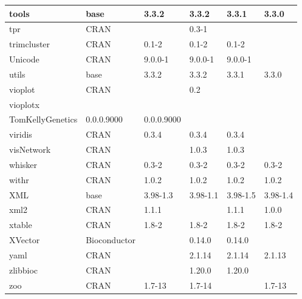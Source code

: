 \begin{longtable}{@{\extracolsep{\fill}}|l|l|l|l|l|l|@{}}
tools                         & base                      & 3.3.2       & 3.3.2       & 3.3.1          & 3.3.0            \\ \hline
tpr                           & CRAN                      &             & 0.3-1       &                &                  \\ \hline
trimcluster                   & CRAN                      & 0.1-2       & 0.1-2       & 0.1-2          &                  \\ \hline
Unicode                       & CRAN                      & 9.0.0-1     & 9.0.0-1     & 9.0.0-1        &                  \\ \hline
utils                         & base                      & 3.3.2       & 3.3.2       & 3.3.1          & 3.3.0            \\ \hline
vioplot                       & CRAN                      &             & 0.2         &                &                  \\ \hline
vioplotx                      & \begin{tabular}[c]{@{}l@{}}GitHub \\ TomKellyGenetics \end{tabular}  & 0.0.0.9000  & 0.0.0.9000  &                &                  \\ \hline
viridis                       & CRAN                      & 0.3.4       & 0.3.4       & 0.3.4          &                  \\ \hline
visNetwork                    & CRAN                      &             & 1.0.3       & 1.0.3          &                  \\ \hline
whisker                       & CRAN                      & 0.3-2       & 0.3-2       & 0.3-2          & 0.3-2            \\ \hline
withr                         & CRAN                      & 1.0.2       & 1.0.2       & 1.0.2          & 1.0.2            \\ \hline
XML                           & base                      & 3.98-1.3    & 3.98-1.1    & 3.98-1.5       & 3.98-1.4         \\ \hline
xml2                          & CRAN                      & 1.1.1       &             & 1.1.1          & 1.0.0            \\ \hline
xtable                        & CRAN                      & 1.8-2       & 1.8-2       & 1.8-2          & 1.8-2            \\ \hline
XVector                       & Bioconductor              &             & 0.14.0      & 0.14.0         &                  \\ \hline
yaml                          & CRAN                      &             & 2.1.14      & 2.1.14         & 2.1.13           \\ \hline
zlibbioc                      & CRAN                      &             & 1.20.0      & 1.20.0         &                  \\ \hline
zoo                           & CRAN                      & 1.7-13      & 1.7-14      &                & 1.7-13           \\ \hline
\end{longtable}
